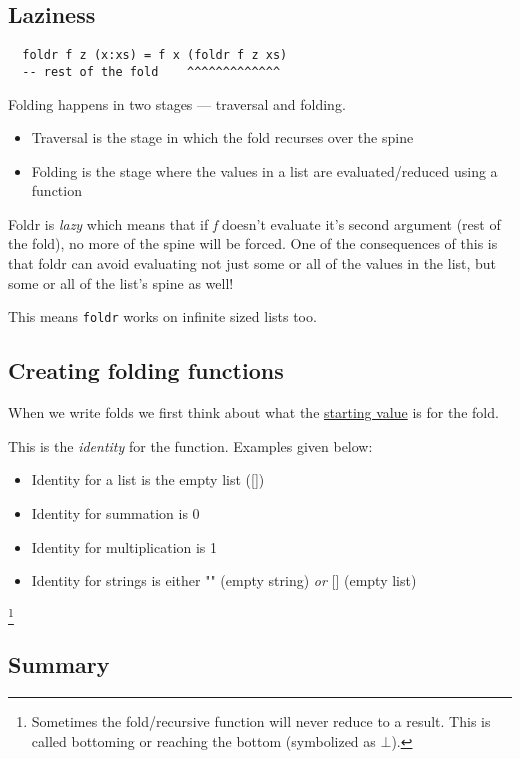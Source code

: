 \subsection{Laziness}
\begin{lstlisting}
  foldr f z (x:xs) = f x (foldr f z xs)
  -- rest of the fold    ^^^^^^^^^^^^^
\end{lstlisting}
Folding happens in two stages --- traversal and folding.
\begin{itemize}
\item Traversal is the stage in which the fold recurses over the spine
\item Folding is the stage where the values in a list are evaluated/reduced using a function
\end{itemize}

Foldr is \emph{lazy} which means that if \emph{f} doesn't evaluate it's second argument (rest of the fold), no more of the spine will be forced.
One of the consequences of this is that foldr can avoid evaluating not just some or all of the values in the list, but some or
all of the list’s spine as well!

This means \texttt{foldr} works on infinite sized lists too.

\subsection{Creating folding functions}
When we write folds we first think about what the \underline{starting value} is for the fold.

This is the \emph{identity} for the function. Examples given below:
\begin{itemize}
\item Identity for a list is the empty list ([])
\item Identity for summation is 0
\item Identity for multiplication is 1
\item Identity for strings is either "" (empty string) \emph{or} [] (empty list)
\end{itemize}

\footnote{Sometimes the fold/recursive function will never reduce to a result. This is called bottoming or reaching the bottom (symbolized as $\bot$).}

\subsection{Summary}

